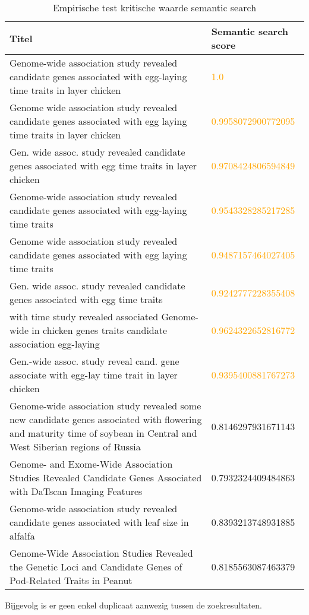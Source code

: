 \begin{table}[h!]
    \caption{Empirische test kritische waarde semantic search}
    \centering
    \begin{tabularx}{\textwidth}{|X|p{4cm}|} 
        \hline
        \textbf{Titel}&\textbf{Semantic search score}\\
        \hline
        Genome-wide association study revealed candidate genes associated with egg-laying time traits in layer chicken&\textcolor{orange}{1.0}\\
        \hline
        Genome wide association study revealed candidate genes associated with egg laying time traits in layer chicken&\textcolor{orange}{0.9958072900772095}\\
        \hline
        Gen. wide assoc. study revealed candidate genes associated with egg time traits in layer chicken&\textcolor{orange}{0.9708424806594849}\\
        \hline
        Genome-wide association study revealed candidate genes associated with egg-laying time traits&\textcolor{orange}{0.9543328285217285}\\
        \hline
        Genome wide association study revealed candidate genes associated with egg laying time traits&\textcolor{orange}{0.9487157464027405}\\
        \hline
        Gen. wide assoc. study revealed candidate genes associated with egg time traits&\textcolor{orange}{0.9242777228355408}\\
        \hline
        with time study revealed associated Genome-wide in chicken genes traits candidate association egg-laying&\textcolor{orange}{0.9624322652816772}\\
        \hline
        Gen.-wide assoc. study reveal cand. gene associate with egg-lay time trait in layer chicken&\textcolor{orange}{0.9395400881767273}\\
        \hline
        Genome-wide association study revealed some new candidate genes associated with flowering and maturity time of soybean in Central and West Siberian regions of Russia&0.8146297931671143\\
        \hline
        Genome- and Exome-Wide Association Studies Revealed Candidate Genes Associated with DaTscan Imaging Features&0.7932324409484863\\
        \hline
        Genome-wide association study revealed candidate genes associated with leaf size in alfalfa&0.8393213748931885\\
        \hline
        Genome-Wide Association Studies Revealed the Genetic Loci and Candidate Genes of Pod-Related Traits in Peanut&0.8185563087463379\\
        \hline
    \end{tabularx}
    \label{table:empirisch}
\end{table}
Bijgevolg is er geen enkel duplicaat aanwezig tussen de zoekresultaten.
